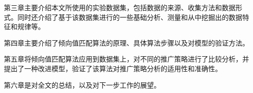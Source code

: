 第三章主要介绍本文所使用的实验数据集，包括数据的来源、收集方法和数据形式。同时还介绍了基于该数据集进行的一些基础分析、测量和从中挖掘出的数据特征和规律等。

第四章主要介绍了倾向值匹配算法的原理、具体算法步骤以及对模型的验证方法。

第五章将倾向值匹配算法应用到数据集上，对不同的推广策略进行了比较分析，并提出了一种改进模型，验证了该算法对推广策略分析的适用性和准确性。

第六章是对全文的总结，以及对下一步工作的展望。





































